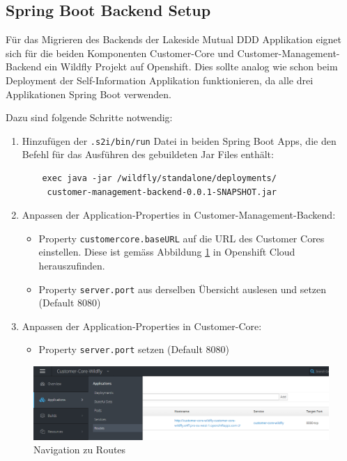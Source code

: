 \documentclass[12pt,a4paper]{article}
\begin{document}
\subsection{Spring Boot Backend Setup}
Für das Migrieren des Backends der Lakeside Mutual DDD Applikation eignet sich für die beiden Komponenten Customer-Core und Customer-Management-Backend ein Wildfly Projekt auf Openshift. Dies sollte analog wie schon beim Deployment der Self-Information Applikation funktionieren, da alle drei Applikationen Spring Boot verwenden. 

Dazu sind folgende Schritte notwendig:
\begin{enumerate}
	\item Hinzufügen der \texttt{.s2i/bin/run} Datei in beiden Spring Boot Apps, die den Befehl für das Ausführen des gebuildeten Jar Files enthält:
	\begin{lstlisting}
	exec java -jar /wildfly/standalone/deployments/
	 customer-management-backend-0.0.1-SNAPSHOT.jar
	\end{lstlisting}
	\item Anpassen der Application-Properties in Customer-Management-Backend: 
	\begin{itemize}
		\item Property \texttt{customercore.baseURL} auf die URL des Customer Cores einstellen. Diese ist gemäss Abbildung \ref{fig:os-routes} in Openshift Cloud herauszufinden. 
		\item Property \texttt{server.port} aus derselben Übersicht auslesen und setzen (Default 8080)
	\end{itemize}
	\item Anpassen der Application-Properties in Customer-Core:
	\begin{itemize}
		\item Property \texttt{server.port} setzen (Default 8080)
	\end{itemize}
\end{enumerate}

\begin{figure}[h]
	\centering
	\includegraphics[width=1\linewidth]{img/os-routes}
	\caption{Navigation zu Routes}
	\label{fig:os-routes}
\end{figure}
\end{document}
